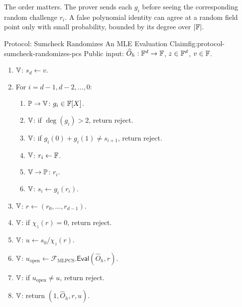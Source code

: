The order matters.  The prover sends each $g_i$ before seeing the corresponding
random challenge $r_i$.  A false polynomial identity can agree at a random
field point only with small probability, bounded by its degree over $|\mathbb{F}|$.

\begin{protocolbox}{Protocol: Sumcheck Randomizes An MLE Evaluation Claim}{fig:protocol-sumcheck-randomizes-pcs}
\noindent Public input: \(\widehat O_h:\mathbb{F}^d\to\mathbb{F}\), \(z\in\mathbb{F}^d\), \(v\in\mathbb{F}\).

\smallskip
\begin{enumerate}[leftmargin=0.24in,label=\textbf{S\arabic*.},itemsep=0.08em,topsep=0.1em,parsep=0pt]
  \item \(\mathbb{V}\): \(s_d\gets v\).
  \item For \(i=d-1,d-2,\ldots,0\):
        \begin{enumerate}[leftmargin=0.28in,label=\textbf{S\arabic*.\alph*.},itemsep=0.05em,topsep=0.05em,parsep=0pt]
          \item \(\mathbb{P}\to\mathbb{V}\): \(g_i\in\mathbb{F}[X]\).
          \item \(\mathbb{V}\): if \(\deg(g_i)>2\), return reject.
          \item \(\mathbb{V}\): if \(g_i(0)+g_i(1)\ne s_{i+1}\), return reject.
          \item \(\mathbb{V}\): \(r_i\leftarrow\mathbb{F}\).
          \item \(\mathbb{V}\to\mathbb{P}\): \(r_i\).
          \item \(\mathbb{V}\): \(s_i\gets g_i(r_i)\).
        \end{enumerate}
  \item \(\mathbb{V}\): \(r\gets(r_0,\ldots,r_{d-1})\).
  \item \(\mathbb{V}\): if \(\chi_z(r)=0\), return reject.
  \item \(\mathbb{V}\): \(u\gets s_0/\chi_z(r)\).
  \item \(\mathbb{V}\): \(u_{\mathrm{open}}\gets
        \mathcal F_{\mathrm{MLPCS}}.\mathsf{Eval}(\widehat O_h,r)\).
  \item \(\mathbb{V}\): if \(u_{\mathrm{open}}\ne u\), return reject.
  \item \(\mathbb{V}\): return \((1,\widehat O_h,r,u)\).
\end{enumerate}
\end{protocolbox}

